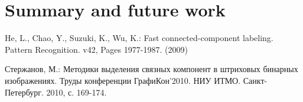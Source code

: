 \documentclass{llncs}
\begin{document}

\section{Summary and future work}


\begin{thebibliography}{5}

He, L., Chao, Y., Suzuki, K., Wu, K.:
Fast connected-component labeling. Pattern Recognition. v42, Pages 1977-1987. (2009)

Стержанов, М.:
Методики выделения связных компонент в штриховых бинарных изображениях.
Труды конференции ГрафиКон’2010. НИУ ИТМО. Санкт-Петербург. 2010, с. 169-174.

\end{thebibliography}
\end{document}
